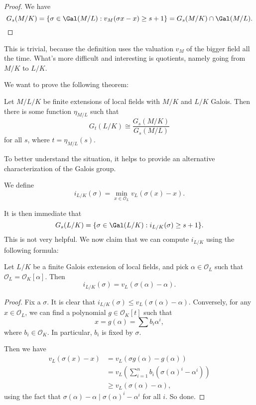 \documentclass[a4paper]{article}
\begin{document}
\begin{proof}
  We have
  \[
    G_s(M/K) = \{\sigma \in \Gal(M/L): v_M(\sigma x - x) \geq s + 1\} = G_s(M/K) \cap \Gal(M/L).
  \]
\end{proof}
This is trivial, because the definition uses the valuation $v_M$ of the bigger field all the time. What's more difficult and interesting is quotients, namely going from $M/K$ to $L/K$.

We want to prove the following theorem:
\begin{thm}
  Let $M/L/K$ be finite extensions of local fields with $M/K$ and $L/K$ Galois. Then there is some function $\eta_{M/L}$ such that
  \[
    G_t(L/K) \cong \frac{G_s(M/K)}{G_s(M/L)}
  \]
  for all $s$, where $t = \eta_{M/L}(s)$.
\end{thm}

To better understand the situation, it helps to provide an alternative characterization of the Galois group.

\begin{defi}[$i_{L/K}$] %
  We define
  \[
    i_{L/K}(\sigma) = \min_{x \in \mathcal{O}_L} v_L(\sigma(x) - x).
  \]
\end{defi}
It is then immediate that
\[
  G_s(L/K) = \{\sigma \in \Gal(L/K): i_{L/K}(\sigma) \geq s + 1\}.
\]
This is not very helpful. We now claim that we can compute $i_{L/K}$ using the following formula:
\begin{prop}
  Let $L/K$ be a finite Galois extension of local fields, and pick $\alpha \in \mathcal{O}_L$ such that $\mathcal{O}_L = \mathcal{O}_K[\alpha]$. Then
  \[
    i_{L/K}(\sigma) = v_L(\sigma(\alpha) - \alpha).
  \]
\end{prop}

\begin{proof}
  Fix a $\sigma$. It is clear that $i_{L/K}(\sigma) \leq v_L(\sigma(\alpha) - \alpha)$. Conversely, for any $x \in \mathcal{O}_L$, we can find a polynomial $g \in \mathcal{O}_K[t]$ such that
  \[
    x = g(\alpha) = \sum b_i \alpha^i,
  \]
  where $b_i \in \mathcal{O}_K$. In particular, $b_i$ is fixed by $\sigma$.

  Then we have
  \begin{align*}
    v_L(\sigma (x) - x) &= v_L(\sigma g(\alpha) - g(\alpha)) \\
    &= v_L\left( \sum_{i = 1}^n b_i (\sigma(\alpha)^i - \alpha^i)\right)\\
    &\geq v_L(\sigma(\alpha) - \alpha),
  \end{align*}
  using the fact that $\sigma(\alpha) - \alpha \mid \sigma(\alpha)^i - \alpha^i$ for all $i$. So done.
\end{proof}
\end{document}
